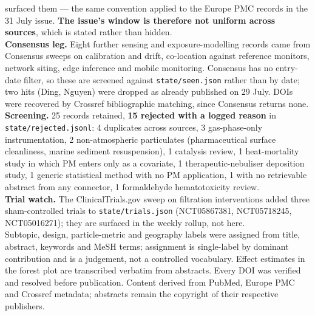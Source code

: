 \documentclass[10pt]{article}
\begin{document}
\begin{keybox}
{surfaced them --- the same convention applied to the Europe PMC records in the 31 July
issue. \textbf{The issue's window is therefore not uniform across sources}, which is
stated rather than hidden.
\\[1.0mm]
\textbf{Consensus leg.} Eight further sensing and exposure-modelling records came from
Consensus sweeps on calibration and drift, co-location against reference monitors,
network siting, edge inference and mobile monitoring. Consensus has no entry-date filter,
so these are screened against \texttt{state/seen.json} rather than by date; two hits
(Ding, Nguyen) were dropped as already published on 29 July. DOIs were recovered by
Crossref bibliographic matching, since Consensus returns none.
\\[1.0mm]
\textbf{Screening.} 25 records retained, \textbf{15 rejected with a logged reason} in
\texttt{state/rejected.jsonl}: 4 duplicates across sources, 3 gas-phase-only
instrumentation, 2 non-atmospheric particulates (pharmaceutical surface cleanliness,
marine sediment resuspension), 1 catalysis review, 1 heat-mortality study in which PM
enters only as a covariate, 1 therapeutic-nebuliser deposition study, 1 generic
statistical method with no PM application, 1 with no retrievable abstract from any
connector, 1 formaldehyde hematotoxicity review.
\\[1.0mm]
\textbf{Trial watch.} The ClinicalTrials.gov sweep on filtration interventions added
three sham-controlled trials to \texttt{state/trials.json} (NCT05867381, NCT05718245,
NCT05016271); they are surfaced in the weekly rollup, not here.
\\[1.0mm]
Subtopic, design, particle-metric and geography labels were assigned from title,
abstract, keywords and MeSH terms; assignment is single-label by dominant contribution
and is a judgement, not a controlled vocabulary. Effect estimates in the forest plot are
transcribed verbatim from abstracts. Every DOI was verified and resolved before
publication. Content derived from PubMed, Europe PMC and Crossref metadata; abstracts
remain the copyright of their respective publishers.\par}
\end{keybox}
\end{document}
